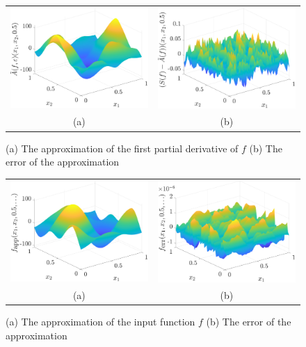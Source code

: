 \documentclass[graybox,footinfo]{svmult}
\begin{document}
\begin{figure}[ht]
	\centering
	\begin{tabular}{cc}
		\includegraphics[width =5.5 cm]{ProgramsImages/SimDirectSolAppx.eps} &
		\includegraphics[width = 5.5 cm]{ProgramsImages/SimDirectSolErr.eps}
		\\ (a) & (b)
	\end{tabular}
	\caption{(a) The approximation of the first partial derivative of $f$
		(b) The error of the approximation 
		\label{solfig}} %
\end{figure}

\begin{figure}[ht]
	\centering
	\begin{tabular}{cc}
		\includegraphics[width = 5.5 cm]{ProgramsImages/SimDirectInpFunAppx.eps}& 
		\includegraphics[width = 5.5 cm]{ProgramsImages/SimDirectInpFunErr.eps}
		\\ (a) & (b)
	\end{tabular}
	\caption{(a) The approximation of the input function $f$
		(b) The error of the approximation 
		\label{inpfig}} %
\end{figure}
\end{document}
